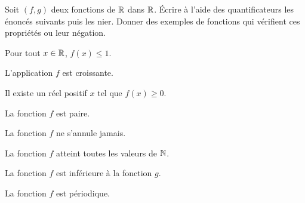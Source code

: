 \documentclass[a4paper, 11pt]{article}
\begin{document}
\begin{exercice}  \;
Soit $(f,g)$ deux fonctions de $\mathbb{R}$ dans $\mathbb{R}$. \'Ecrire \`a l'aide des quantificateurs les \'enonc\'es suivants puis les nier. Donner des exemples de fonctions qui vérifient ces propriétés ou leur négation.
\begin{enumerate}
\begin{minipage}[t]{0.55\textwidth}
\item Pour tout $x\in\mathbb{R}$, $f(x)\leq 1$. 
\item 
L'application $f$ est croissante.
\item 
Il existe un r\'eel positif $x$ tel que $f(x)\geq 0$.
\item 
La fonction $f$ est paire.
\end{minipage}
\begin{minipage}[t]{0.45\textwidth}
\item
La fonction $f$ ne s'annule jamais.
\item La fonction $f$ atteint toutes les valeurs de $\mathbb{N}$.
\item
La fonction $f$ est inf\'erieure \`a la fonction $g$.
\item
La fonction $f$ est p\'eriodique.
\end{minipage}
\end{enumerate}
\end{exercice}

\end{document}
